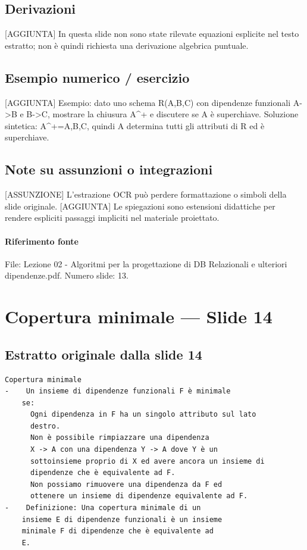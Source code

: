 \documentclass[11pt]{article}
\begin{document}
\subsection*{Derivazioni}
[AGGIUNTA] In questa slide non sono state rilevate equazioni esplicite nel testo estratto; non è quindi richiesta una derivazione algebrica puntuale.
\subsection*{Esempio numerico / esercizio}
[AGGIUNTA] Esempio: dato uno schema R(A,B,C) con dipendenze funzionali A->B e B->C, mostrare la chiusura A^+ e discutere se A è superchiave. Soluzione sintetica: A^+={A,B,C}, quindi A determina tutti gli attributi di R ed è superchiave.
\subsection*{Note su assunzioni o integrazioni}
[ASSUNZIONE] L'estrazione OCR può perdere formattazione o simboli della slide originale.
[AGGIUNTA] Le spiegazioni sono estensioni didattiche per rendere espliciti passaggi impliciti nel materiale proiettato.
\paragraph{Riferimento fonte} File: Lezione 02 - Algoritmi per la progettazione di DB Relazionali e ulteriori dipendenze.pdf. Numero slide: 13.
\section{Copertura minimale --- Slide 14}
\subsection*{Estratto originale dalla slide 14}
\begin{lstlisting}
Copertura minimale
-    Un insieme di dipendenze funzionali F è minimale
    se:
      Ogni dipendenza in F ha un singolo attributo sul lato
      destro.
      Non è possibile rimpiazzare una dipendenza
      X -> A con una dipendenza Y -> A dove Y è un
      sottoinsieme proprio di X ed avere ancora un insieme di
      dipendenze che è equivalente ad F.
      Non possiamo rimuovere una dipendenza da F ed
      ottenere un insieme di dipendenze equivalente ad F.
-    Definizione: Una copertura minimale di un
    insieme E di dipendenze funzionali è un insieme
    minimale F di dipendenze che è equivalente ad
    E.
\end{lstlisting}
\end{document}
